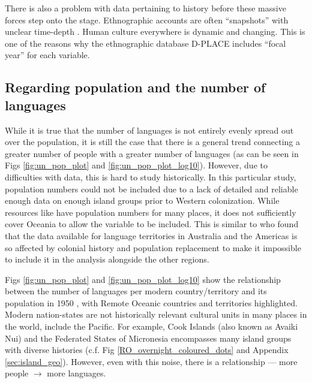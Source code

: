 \documentclass[12pt,letterpaper]{article}
\begin{document}
There is also a problem with data pertaining to history before these massive forces step onto the stage. Ethnographic accounts are often ``snapshots'' with unclear time-depth 
 \citep[113]{bedford2008northern}. Human culture everywhere is dynamic and changing. This is one of the reasons why the ethnographic database D-PLACE \citep{d_place_all} includes ``focal year'' for each variable.




\newpage
\subsection{Regarding population and the number of languages}
\label{appendix_pop_vs_languages}
While it is true that the number of languages is not entirely evenly spread out over the population, it is still the case that there is a general trend connecting a greater number of people with a greater number of languages (as can be seen in Figs \ref{fig:un_pop_plot} and \ref{fig:un_pop_plot_log10}). However, due to difficulties with data, this is hard to study historically. In this particular study, population numbers could not be included due to a lack of detailed and reliable enough data on enough island groups prior to Western colonization. While resources like \citet{elcat} have population numbers for many places, it does not sufficiently cover Oceania to allow the variable to be included. This is similar to \citet[7340-7341]{curriemace2009} who found that the data available for language territories in Australia and the Americas is so affected by colonial history and population replacement to make it impossible to include it in the analysis alongside the other regions. 

Figs \ref{fig:un_pop_plot} and \ref{fig:un_pop_plot_log10} show the relationship between the number of languages per modern country/territory \citep{glottolog4_5} and its population in 1950 \citep{UN_pop}, with Remote Oceanic countries and territories highlighted. Modern nation-states are not historically relevant cultural units in many places in the world, include the Pacific. For example, Cook Islands (also known as Avaiki Nui) and the Federated States of Micronesia encompasses many island groups with diverse histories (c.f. Fig \ref{RO_overnight_coloured_dots} and Appendix \ref{sec:island_geo}). However, even with this noise, there is a relationship --- more people $\rightarrow$ more languages.
\end{document}
